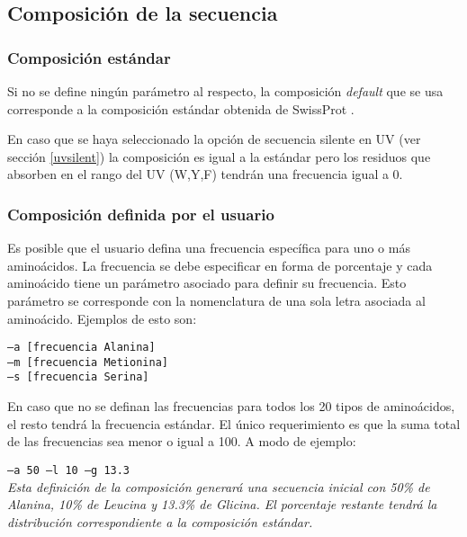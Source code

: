 \subsection{Composición de la secuencia} \label{composicion}

\subsubsection{Composición estándar}
Si no se define ningún parámetro al respecto, la composición \textit{default} que se usa corresponde a la composición estándar obtenida de SwissProt \cite{compositionAA}.  

En caso que se haya seleccionado la opción de secuencia silente en UV (ver sección \ref{uvsilent}) la composición es igual a la estándar pero los residuos que absorben en el rango del UV (W,Y,F) tendrán una frecuencia igual a 0.

\subsubsection{Composición definida por el usuario}

Es posible que el usuario defina una frecuencia específica para uno o más aminoácidos. 
La frecuencia se debe especificar en forma de porcentaje y cada aminoácido tiene un parámetro asociado para definir su frecuencia. 
Esto parámetro se corresponde con la nomenclatura de una sola letra asociada al aminoácido. Ejemplos de esto son:

\indent \texttt{--a  [frecuencia Alanina]} \\
\indent \texttt{--m  [frecuencia Metionina]} \\
\indent \texttt{--s  [frecuencia Serina]} 

En caso que no se definan las frecuencias para todos los 20 tipos de aminoácidos, el resto tendrá la frecuencia estándar. El único requerimiento es que la suma total de las frecuencias sea menor o igual a 100.
A modo de ejemplo:

\indent \texttt{--a 50 --l 10 --g 13.3 } \\
\textit{Esta definición de la composición generará una secuencia inicial con 50\% de Alanina, 10\% de Leucina y 13.3\% de Glicina. 
El porcentaje restante tendrá la distribución correspondiente a la composición estándar.}



